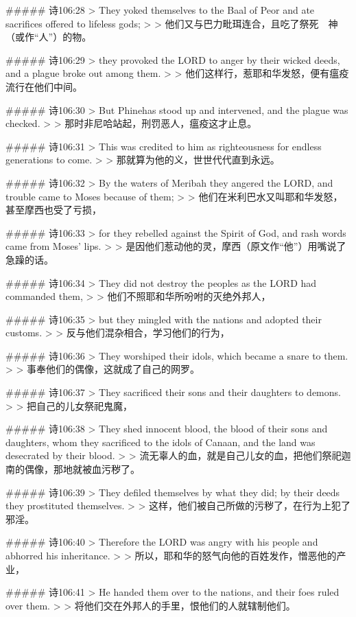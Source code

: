 ##### 诗106:28
> They yoked themselves to the Baal of Peor and ate sacrifices offered to lifeless gods;
>
> 他们又与巴力毗珥连合，且吃了祭死　神（或作“人”）的物。


##### 诗106:29
> they provoked the LORD to anger by their wicked deeds, and a plague broke out among them.
>
> 他们这样行，惹耶和华发怒，便有瘟疫流行在他们中间。


##### 诗106:30
> But Phinehas stood up and intervened, and the plague was checked.
>
> 那时非尼哈站起，刑罚恶人，瘟疫这才止息。


##### 诗106:31
> This was credited to him as righteousness for endless generations to come.
>
> 那就算为他的义，世世代代直到永远。


##### 诗106:32
> By the waters of Meribah they angered the LORD, and trouble came to Moses because of them;
>
> 他们在米利巴水又叫耶和华发怒，甚至摩西也受了亏损，


##### 诗106:33
> for they rebelled against the Spirit of God, and rash words came from Moses' lips.
>
> 是因他们惹动他的灵，摩西（原文作“他”）用嘴说了急躁的话。


##### 诗106:34
> They did not destroy the peoples as the LORD had commanded them,
>
> 他们不照耶和华所吩咐的灭绝外邦人，


##### 诗106:35
> but they mingled with the nations and adopted their customs.
>
> 反与他们混杂相合，学习他们的行为，


##### 诗106:36
> They worshiped their idols, which became a snare to them.
>
> 事奉他们的偶像，这就成了自己的网罗。


##### 诗106:37
> They sacrificed their sons and their daughters to demons.
>
> 把自己的儿女祭祀鬼魔，


##### 诗106:38
> They shed innocent blood, the blood of their sons and daughters, whom they sacrificed to the idols of Canaan, and the land was desecrated by their blood.
>
> 流无辜人的血，就是自己儿女的血，把他们祭祀迦南的偶像，那地就被血污秽了。


##### 诗106:39
> They defiled themselves by what they did; by their deeds they prostituted themselves.
>
> 这样，他们被自己所做的污秽了，在行为上犯了邪淫。


##### 诗106:40
> Therefore the LORD was angry with his people and abhorred his inheritance.
>
> 所以，耶和华的怒气向他的百姓发作，憎恶他的产业，


##### 诗106:41
> He handed them over to the nations, and their foes ruled over them.
>
> 将他们交在外邦人的手里，恨他们的人就辖制他们。


